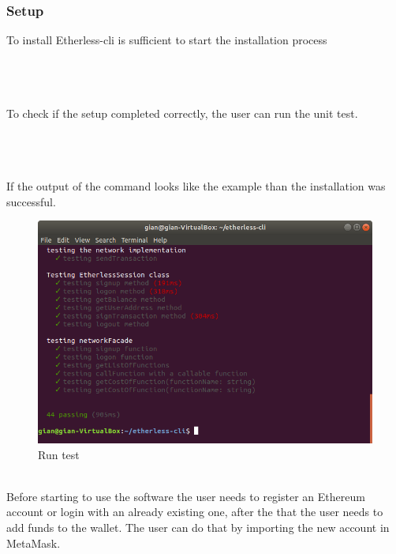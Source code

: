 \subsubsection{Setup}
To install Etherless-cli is sufficient to start the installation process\\\\
\centerline{}\\\\
To check if the setup completed correctly, the user can run the unit test.\\\\
\centerline{}\\\\
If the output of the command looks like the example than the installation was successful.\\
\begin{figure}[h!]
	\includegraphics[width=\textwidth]{res/img/npmruntest.png}
	\caption{Run test}
\end{figure}\\
\newpage
\noindent Before starting to use the software the user needs to register an Ethereum account or login with an already existing one, after the that the user needs to add funds to the wallet. The user can do that by importing the new account in MetaMask\glo.
